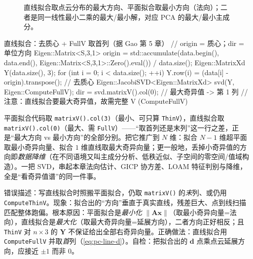 \begin{figure}[H]\centering
{}
\caption{直线拟合取点云分布的最大方向、平面拟合取最小方向（法向）；二者是同一线性最小二乘的最大/最小解，对应 PCA 的最大/最小主成分。}
\label{fig:pc-fit-dual}
\end{figure}

\begin{codebox}[C++]{直线拟合：去质心 + FullV 取首列（据 Gao 第 5 章）}
// origin = 质心；dir = 单位方向
Eigen::Matrix<S,3,1> origin =
    std::accumulate(data.begin(), data.end(),
                    Eigen::Matrix<S,3,1>::Zero().eval()) / data.size();
Eigen::MatrixXd Y(data.size(), 3);
for (int i = 0; i < data.size(); ++i)
  Y.row(i) = (data[i] - origin).transpose();        // 去质心
Eigen::JacobiSVD<Eigen::MatrixXd> svd(Y, Eigen::ComputeFullV);
dir = svd.matrixV().col(0);                          // 最大奇异值 -> 第 1 列
// 注意：直线拟合要最大奇异值，故需完整 V (ComputeFullV)
\end{codebox}

\begin{insight}
平面拟合代码取 \texttt{matrixV().col(3)}（最小、可只算 \texttt{ThinV}），直线拟合取 \texttt{matrixV().col(0)}（最大、需 \texttt{FullV}）——“取首列还是末列”这一行之差，正是“最大方向 vs 最小方向”的全部分别。把它推广到 $N$ 维：拟合 $N\!-\!1$ 维超平面取最小奇异向量、拟合 $1$ 维直线取最大奇异向量；更一般地，丢掉小奇异值的方向即\emph{数据降维}（在不同语境又叫主成分分析、低秩近似、子空间的零空间/值域构造）。一把 SVD，串起本章法向估计、GICP 协方差、LOAM 特征判别与降维，全是“看奇异值谱”的同一件事。
\end{insight}

\begin{pitfall}
错误描述：写直线拟合时照搬平面拟合，仍取 \texttt{matrixV()} 的\emph{末}列、或仍用 \texttt{ComputeThinV}。现象：拟合出的“方向”垂直于真实直线，残差巨大、点到线扫描匹配整体跑偏。根本原因：平面拟合是\emph{最小化} $\|\mathbf{A}\mathbf{x}\|$（取最小奇异向量=法向），直线拟合是\emph{最大化}（取最大奇异向量=延展方向），二者方向正好相反；且 \texttt{ThinV} 对 $n\times3$ 的 $\mathbf{Y}$ 不保证给出全部右奇异向量。正确做法：直线拟合用 \texttt{ComputeFullV} 并取\emph{首}列（\cref{eq:pc-line-d}）。自检：把拟合出的 $\mathbf{d}$ 点乘点云延展方向，应接近 $\pm1$ 而非 $0$。
\end{pitfall}

